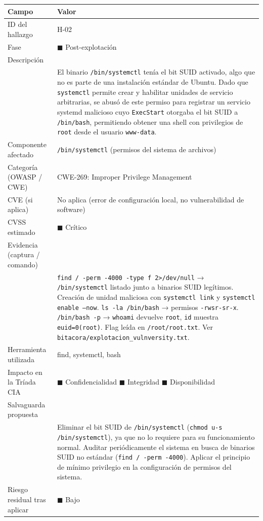 \documentclass[11pt,a4paper]{article}
\begin{document}
\begin{center}
\renewcommand{\arraystretch}{1.5}
\begin{longtable}{@{} p{3.5cm} p{10cm} @{}}
\toprule
\textbf{Campo} & \textbf{Valor} \\
\midrule
ID del hallazgo & H-02 \\
\midrule
Fase & $\blacksquare$ Post-explotación \\
\midrule
Descripción & \\
& El binario \texttt{/bin/systemctl} tenía el bit SUID activado, algo que no es parte de una instalación estándar de Ubuntu. Dado que \texttt{systemctl} permite crear y habilitar unidades de servicio arbitrarias, se abusó de este permiso para registrar un servicio systemd malicioso cuyo \texttt{ExecStart} otorgaba el bit SUID a \texttt{/bin/bash}, permitiendo obtener una shell con privilegios de \texttt{root} desde el usuario \texttt{www-data}. \\
\midrule
Componente afectado & \texttt{/bin/systemctl} (permisos del sistema de archivos) \\
\midrule
Categoría (OWASP / CWE) & CWE-269: Improper Privilege Management \\
\midrule
CVE (si aplica) & No aplica (error de configuración local, no vulnerabilidad de software) \\
\midrule
CVSS estimado & $\blacksquare$ Crítico \\
\midrule
Evidencia (captura / comando) & \\
& \texttt{find / -perm -4000 -type f 2>/dev/null} → \texttt{/bin/systemctl} listado junto a binarios SUID legítimos. Creación de unidad maliciosa con \texttt{systemctl link} y \texttt{systemctl enable --now}. \texttt{ls -la /bin/bash} → permisos \texttt{-rwsr-sr-x}. \texttt{/bin/bash -p} → \texttt{whoami} devuelve \texttt{root}, \texttt{id} muestra \texttt{euid=0(root)}. Flag leída en \texttt{/root/root.txt}. Ver \texttt{bitacora/explotacion\_vulnversity.txt}. \\
\midrule
Herramienta utilizada & find, systemctl, bash \\
\midrule
Impacto en la Tríada CIA & $\blacksquare$ Confidencialidad $\blacksquare$ Integridad $\blacksquare$ Disponibilidad \\
\midrule
Salvaguarda propuesta & \\
& Eliminar el bit SUID de \texttt{/bin/systemctl} (\texttt{chmod u-s /bin/systemctl}), ya que no lo requiere para su funcionamiento normal. Auditar periódicamente el sistema en busca de binarios SUID no estándar (\texttt{find / -perm -4000}). Aplicar el principio de mínimo privilegio en la configuración de permisos del sistema. \\
\midrule
Riesgo residual tras aplicar & $\blacksquare$ Bajo \\
\bottomrule
\end{longtable}
\end{center}
\end{document}
